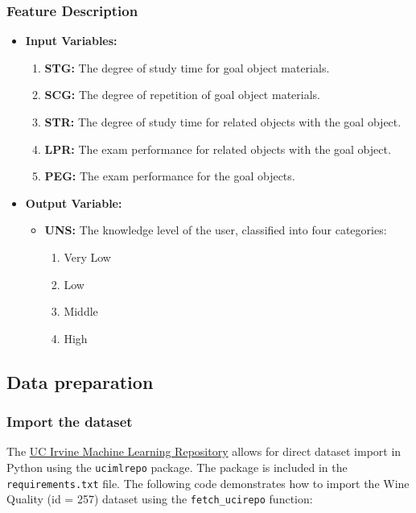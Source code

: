 \subsubsection*{Feature Description}
\begin{itemize}
    \item \textbf{Input Variables:}
    \begin{enumerate}
        \item \textbf{STG:} The degree of study time for goal object materials.
        \item \textbf{SCG:} The degree of repetition of goal object materials.
        \item \textbf{STR:} The degree of study time for related objects with the goal object.
        \item \textbf{LPR:} The exam performance for related objects with the goal object.
        \item \textbf{PEG:} The exam performance for the goal objects.
    \end{enumerate}
    \item \textbf{Output Variable:}
    \begin{itemize}
        \item \textbf{UNS:} The knowledge level of the user, classified into four categories:
        \begin{enumerate}
            \item Very Low
            \item Low
            \item Middle
            \item High
        \end{enumerate}
    \end{itemize}
\end{itemize}

\subsection{Data preparation}

\subsubsection{Import the dataset}

The \href{https://archive.ics.uci.edu/}{UC Irvine Machine Learning Repository} allows for direct dataset import in Python using the \texttt{ucimlrepo} package. The package is included in the \texttt{requirements.txt} file. The following code demonstrates how to import the Wine Quality (id = 257) dataset using the \texttt{fetch\_ucirepo} function:

